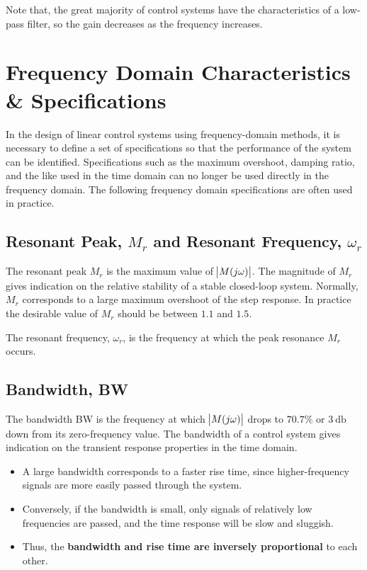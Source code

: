 \documentclass[
  14pt,
  a4paper,
  oneside,
  open=any,
  a4paper,
  14pt]{report}
\providecommand{\tightlist}{%
  \setlength{\itemsep}{0pt}\setlength{\parskip}{0pt}}\usepackage{longtable,booktabs,array}
\begin{document}
Note that, the great majority of control systems have the
characteristics of a low-pass filter, so the gain decreases as the
frequency increases.

\section{Frequency Domain Characteristics \&
Specifications}\label{frequency-domain-characteristics-specifications}

In the design of linear control systems using frequency-domain methods,
it is necessary to define a set of specifications so that the
performance of the system can be identified. Specifications such as the
maximum overshoot, damping ratio, and the like used in the time domain
can no longer be used directly in the frequency domain. The following
frequency domain specifications are often used in practice.

\subsection{\texorpdfstring{Resonant Peak, \(M_r\) and Resonant
Frequency,
\(\omega_r\)}{Resonant Peak, M\_r and Resonant Frequency, \textbackslash omega\_r}}\label{resonant-peak-m_r-and-resonant-frequency-omega_r}

The resonant peak \(M_r\) is the maximum value of \(\abs{M(j\omega)}\).
The magnitude of \(M_r\) gives indication on the relative stability of a
stable closed-loop system. Normally, \(M_r\) corresponds to a large
maximum overshoot of the step response. In practice the desirable value
of \(M_r\) should be between \(1.1\) and \(1.5\).

The resonant frequency, \(\omega_r\), is the frequency at which the peak
resonance \(M_r\) occurs.

\subsection{Bandwidth, BW}\label{bandwidth-bw}

The bandwidth BW is the frequency at which \(\abs{M(j\omega)}\) drops to
\(70.7\%\) or \(\SI{3}{\decibel}\) down from its zero-frequency value.
The bandwidth of a control system gives indication on the transient
response properties in the time domain.

\begin{itemize}
\tightlist
\item
  A large bandwidth corresponds to a faster rise time, since
  higher-frequency signals are more easily passed through the system.
\item
  Conversely, if the bandwidth is small, only signals of relatively low
  frequencies are passed, and the time response will be slow and
  sluggish.
\item
  Thus, the \textbf{bandwidth and rise time are inversely proportional}
  to each other.
\end{itemize}
\end{document}
